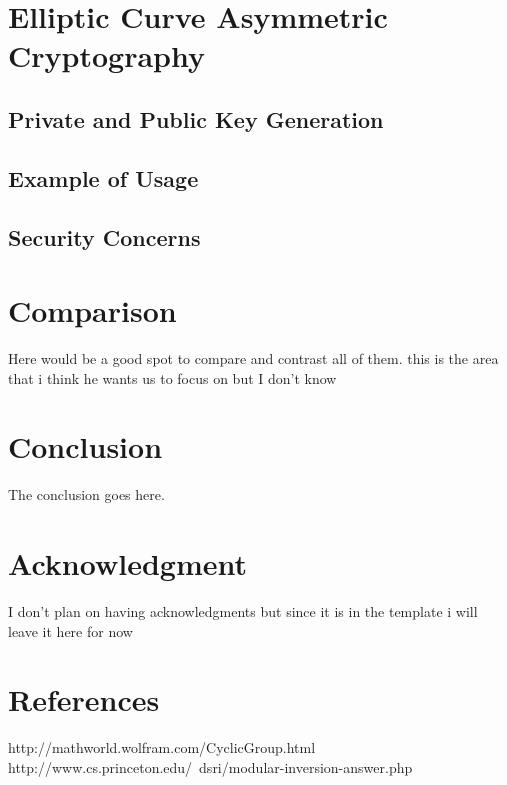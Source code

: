\documentclass[conference]{IEEEtran}
\begin{document}
\section{Elliptic Curve Asymmetric Cryptography}

\subsection{Private and Public Key Generation}

\subsection{Example of Usage}

\subsection{Security Concerns}


\section{Comparison}
Here would be a good spot to compare and contrast all of them. this is the area that i think he wants us to focus on but I don't know


\section{Conclusion}
The conclusion goes here.


\section*{Acknowledgment}

I don't plan on having acknowledgments but since it is in the template i will leave it here for now





\section{References}
http://mathworld.wolfram.com/CyclicGroup.html \newline
http://www.cs.princeton.edu/~dsri/modular-inversion-answer.php \newline

\end{document}
